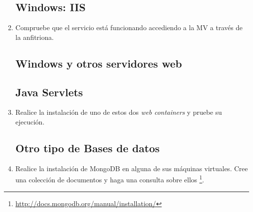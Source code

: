 \documentclass[paper=a4, fontsize=11pt]{scrartcl} %
\numberwithin{equation}{section} %
\numberwithin{figure}{section} %
\numberwithin{table}{section} %
\begin{document}
\begin{enumerate}
	
	\subsection{Windows: IIS}
		\item Compruebe que el servicio está funcionando accediendo a la MV a través de la anfitriona.
	\subsection{Windows y otros servidores web}
	\subsection{Java Servlets}
		\item Realice la instalación de uno de estos dos \textit{web containers} y pruebe su ejecución.
	
	\subsection{Otro tipo de Bases de datos}
		\item Realice la instalación de MongoDB en alguna de sus máquinas virtuales. Cree una colección
		de documentos y haga una consulta sobre ellos
		\footnote{\url{http://docs.mongodb.org/manual/installation/}}.
	

\end{enumerate}
\end{document}
